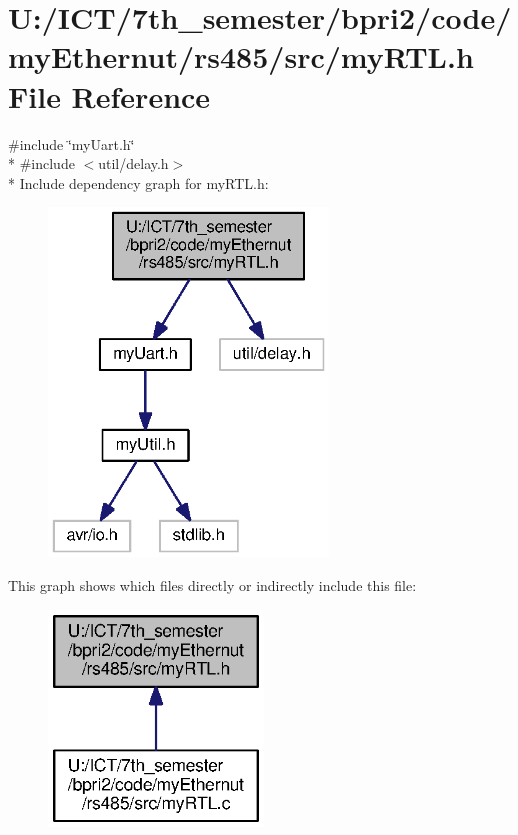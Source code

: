 \section{U\+:/\+I\+C\+T/7th\+\_\+semester/bpri2/code/my\+Ethernut/rs485/src/my\+R\+T\+L.h File Reference}
\label{my_r_t_l_8h}
{\ttfamily \#include \char`\"{}my\+Uart.\+h\char`\"{}}\\*
{\ttfamily \#include $<$util/delay.\+h$>$}\\*
Include dependency graph for my\+R\+T\+L.\+h\+:\nopagebreak
\begin{figure}[H]
\begin{center}
\leavevmode
\includegraphics[width=211pt]{my_r_t_l_8h__incl}
\end{center}
\end{figure}
This graph shows which files directly or indirectly include this file\+:\nopagebreak
\begin{figure}[H]
\begin{center}
\leavevmode
\includegraphics[width=162pt]{my_r_t_l_8h__dep__incl}
\end{center}
\end{figure}
